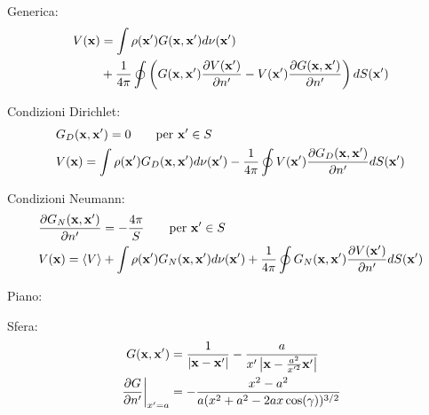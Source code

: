 Generica:
\begin{align*}
	V({\bf x}) &= \int \rho({\bf x'})G({\bf x},{\bf x'}) d\nu({\bf x'})\\%
			   &+ \frac{1}{4\pi} \oint \left(%
		G({\bf x},{\bf x'})\frac{\p V({\bf x'})}{\p n'} - V({\bf x'}) \frac{\p G({\bf x},{\bf x'})}{\p n'}%
	\right) dS({\bf x'})
\end{align*}

Condizioni Dirichlet:
\begin{align*}
	&G_D({\bf x},{\bf x'}) = 0 \qquad \text{per } {\bf x'} \in S \\
	&V({\bf x}) = \int \rho({\bf x'})G_D({\bf x},{\bf x'}) d\nu({\bf x'})%
		- \frac{1}{4\pi} \oint V({\bf x'}) \frac{\p G_D({\bf x},{\bf x'})}{\p n'} dS({\bf x'})
\end{align*}

Condizioni Neumann:
\begin{align*}
	&\frac{\p G_N({\bf x},{\bf x'})}{\p n'} = - \frac{4\pi}{S} \qquad \text{per } {\bf x'} \in S \\
	&V({\bf x}) = \langle V \rangle + \int \rho({\bf x'})G_N({\bf x},{\bf x'}) d\nu({\bf x'})%
		+ \frac{1}{4\pi} \oint G_N({\bf x},{\bf x'})\frac{\p V({\bf x'})}{\p n'} dS({\bf x'})
\end{align*}

Piano:

Sfera:
\begin{align*}
	G({\bf x}, {\bf x'}) &= \frac{1}{\left|{\bf x} - {\bf x'}\right|} - \frac{a}{x'\left|{{\bf x} - \frac{a^2}{x'^2}{\bf x'}}\right|} \\
	\left. \frac{\partial G}{\partial n'} \right|_{x'=a} &= - \frac{x^2 - a^2}{a(x^2 + a^2 - 2ax\cos(\gamma))^{3/2}}
\end{align*}
